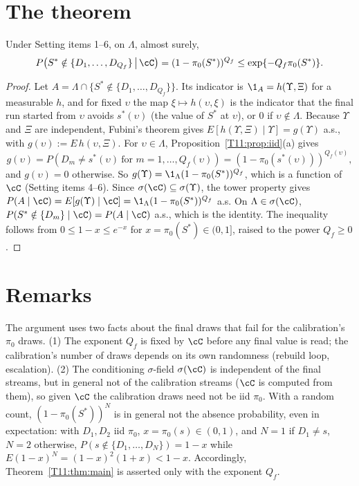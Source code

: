 \documentclass[11pt]{report}
\begin{document}
\section{The theorem}

\begin{T11theorem}[T11(iii)]\label{T11:thm:main}
Under Setting items 1--6, on $\Lambda$, almost surely,
\[
P\big(S^*\notin\{D_1,\dots,D_{Q_f}\}\,\big|\,\cC\big)=(1-\pi_0(S^*))^{Q_f}\le\exp\{-Q_f\pi_0(S^*)\}.
\]
\end{T11theorem}

\begin{proof}
Let $A=\Lambda\cap\{S^*\notin\{D_1,\dots,D_{Q_f}\}\}$. Its indicator is $\1_A=h(\Upsilon,\Xi)$ for a measurable $h$, and
for fixed $\upsilon$ the map $\xi\mapsto h(\upsilon,\xi)$ is the indicator that the final run started from $\upsilon$
avoids $s^*(\upsilon)$ (the value of $S^*$ at $\upsilon$), or $0$ if $\upsilon\notin\Lambda$. Because $\Upsilon$ and
$\Xi$ are independent, Fubini's theorem gives $E[h(\Upsilon,\Xi)\mid\Upsilon]=g(\Upsilon)$ a.s., with
$g(\upsilon):=E\,h(\upsilon,\Xi)$. For $\upsilon\in\Lambda$, Proposition~\ref{T11:prop:iid}(a) gives
\[
g(\upsilon)=P(D_m\ne s^*(\upsilon)\ \text{for } m=1,\dots,Q_f(\upsilon))=(1-\pi_0(s^*(\upsilon)))^{Q_f(\upsilon)},
\]
and $g(\upsilon)=0$ otherwise. So $g(\Upsilon)=\1_\Lambda(1-\pi_0(S^*))^{Q_f}$, which is a function of $\cC$ (Setting
items 4--6). Since $\sigma(\cC)\subseteq\sigma(\Upsilon)$, the tower property gives
$P(A\mid\cC)=E[g(\Upsilon)\mid\cC]=\1_\Lambda(1-\pi_0(S^*))^{Q_f}$ a.s. On $\Lambda\in\sigma(\cC)$,
$P(S^*\notin\{D_m\}\mid\cC)=P(A\mid\cC)$ a.s., which is the identity. The inequality follows from
$0\le1-x\le e^{-x}$ for $x=\pi_0(S^*)\in(0,1]$, raised to the power $Q_f\ge0$.
\end{proof}

\section{Remarks}

\begin{T11remark}\label{T11:rem:scope}
The argument uses two facts about the final draws that fail for the calibration's $\pi_0$ draws. (1) The exponent
$Q_f$ is fixed by $\cC$ before any final value is read; the calibration's number of draws depends on its own
randomness (rebuild loop, escalation). (2) The conditioning $\sigma$-field $\sigma(\cC)$ is independent of the final
streams, but in general not of the calibration streams ($\cC$ is computed from them), so given $\cC$ the calibration
draws need not be iid $\pi_0$. With a random count, $(1-\pi_0(S^*))^N$ is in general not the absence probability, even in expectation: with
$D_1,D_2$ iid $\pi_0$, $x=\pi_0(s)\in(0,1)$, and $N=1$ if $D_1\ne s$, $N=2$ otherwise,
$P(s\notin\{D_1,\dots,D_N\})=1-x$ while $E(1-x)^N=(1-x)^2(1+x)<1-x$. Accordingly, Theorem~\ref{T11:thm:main} is asserted
only with the exponent $Q_f$.
\end{T11remark}
\end{document}

